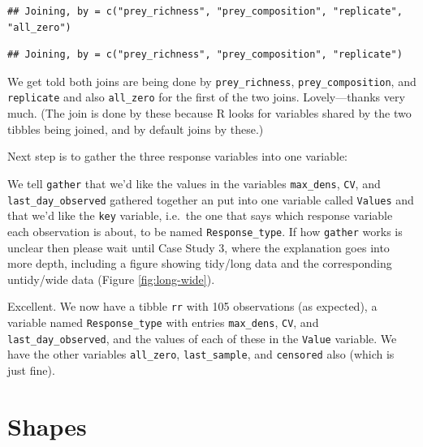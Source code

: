 \documentclass[]{book}
\newenvironment{Shaded}{\begin{snugshade}}{\end{snugshade}}
\newcommand{\DataTypeTok}[1]{\textcolor[rgb]{0.13,0.29,0.53}{#1}}
\newcommand{\KeywordTok}[1]{\textcolor[rgb]{0.13,0.29,0.53}{\textbf{#1}}}
\newcommand{\NormalTok}[1]{#1}
\newcommand{\OperatorTok}[1]{\textcolor[rgb]{0.81,0.36,0.00}{\textbf{#1}}}
\newcommand{\StringTok}[1]{\textcolor[rgb]{0.31,0.60,0.02}{#1}}
\begin{document}
\begin{verbatim}
## Joining, by = c("prey_richness", "prey_composition", "replicate", "all_zero")
\end{verbatim}

\begin{verbatim}
## Joining, by = c("prey_richness", "prey_composition", "replicate")
\end{verbatim}

We get told both joins are being done by \texttt{prey\_richness}, \texttt{prey\_composition}, and \texttt{replicate} and also \texttt{all\_zero} for the first of the two joins. Lovely---thanks very much. (The join is done by these because R looks for variables shared by the two tibbles being joined, and by default joins by these.)

Next step is to gather the three response variables into one variable:

\begin{Shaded}
\end{Shaded}

We tell \texttt{gather} that we'd like the values in the variables \texttt{max\_dens}, \texttt{CV}, and \texttt{last\_day\_observed} gathered together an put into one variable called \texttt{Values} and that we'd like the \texttt{key} variable, i.e.~the one that says which response variable each observation is about, to be named \texttt{Response\_type}. If how \texttt{gather} works is unclear then please wait until Case Study 3, where the explanation goes into more depth, including a figure showing tidy/long data and the corresponding untidy/wide data (Figure \ref{fig:long-wide}).

Excellent. We now have a tibble \texttt{rr} with 105 observations (as expected), a variable named \texttt{Response\_type} with entries \texttt{max\_dens}, \texttt{CV}, and \texttt{last\_day\_observed}, and the values of each of these in the \texttt{Value} variable. We have the other variables \texttt{all\_zero}, \texttt{last\_sample}, and \texttt{censored} also (which is just fine).

\hypertarget{shapes-1}{%
\section{Shapes}\label{shapes-1}}
\end{document}
